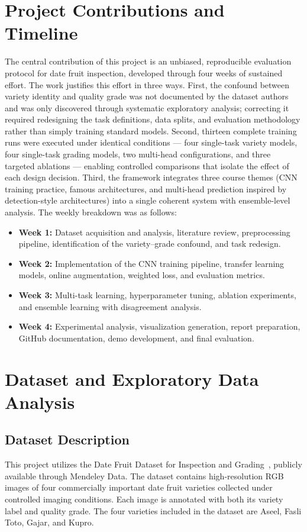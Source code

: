 \documentclass[conference]{IEEEtran}
\begin{document}
\section{Project Contributions and Timeline}
The central contribution of this project is an unbiased, reproducible evaluation protocol for date fruit inspection, developed through four weeks of sustained effort. The work justifies this effort in three ways. First, the confound between variety identity and quality grade was not documented by the dataset authors and was only discovered through systematic exploratory analysis; correcting it required redesigning the task definitions, data splits, and evaluation methodology rather than simply training standard models. Second, thirteen complete training runs were executed under identical conditions --- four single-task variety models, four single-task grading models, two multi-head configurations, and three targeted ablations --- enabling controlled comparisons that isolate the effect of each design decision. Third, the framework integrates three course themes (CNN training practice, famous architectures, and multi-head prediction inspired by detection-style architectures) into a single coherent system with ensemble-level analysis. The weekly breakdown was as follows:
\begin{itemize}
\item \textbf{Week 1:} Dataset acquisition and analysis, literature review, preprocessing pipeline, identification of the variety--grade confound, and task redesign.
\item \textbf{Week 2:} Implementation of the CNN training pipeline, transfer learning models, online augmentation, weighted loss, and evaluation metrics.
\item \textbf{Week 3:} Multi-task learning, hyperparameter tuning, ablation experiments, and ensemble learning with disagreement analysis.
\item \textbf{Week 4:} Experimental analysis, visualization generation, report preparation, GitHub documentation, demo development, and final evaluation.
\end{itemize}

\section{Dataset and Exploratory Data Analysis}
\subsection{Dataset Description}
This project utilizes the Date Fruit Dataset for Inspection and Grading~\cite{maitlo2023dataset}, publicly available through Mendeley Data. The dataset contains high-resolution RGB images of four commercially important date fruit varieties collected under controlled imaging conditions. Each image is annotated with both its variety label and quality grade. The four varieties included in the dataset are Aseel, Fasli Toto, Gajar, and Kupro.
\end{document}
